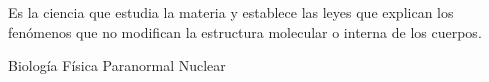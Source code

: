 
\question Es la ciencia que estudia la materia y establece las leyes que
  explican los fenómenos que no modifican la estructura molecular o interna
  de los cuerpos.

  \begin{oneparchoices}
    \choice Biología
    \CorrectChoice Física
    \choice Paranormal
    \choice Nuclear
  \end{oneparchoices}
  \answerline[B]
